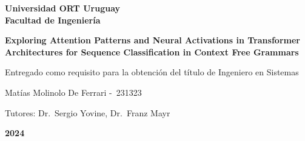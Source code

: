 \begin{center}

\textbf{\fontsize{14pt}{21pt}\selectfont Universidad ORT Uruguay\\Facultad de Ingeniería}

\bigskip\bigskip\bigskip\bigskip


\fontsize{24.88pt}{30pt}\selectfont 
\textbf{Exploring Attention Patterns and Neural Activations in Transformer Architectures for Sequence Classification in Context Free Grammars}


\bigskip\bigskip\bigskip\bigskip


\fontsize{14pt}{21pt}\selectfont Entregado como requisito para la obtención del título de Ingeniero en Sistemas


\bigskip
\bigskip
\bigskip\bigskip\bigskip


\fontsize{14pt}{21pt}\selectfont Matías Molinolo De Ferrari -\ 231323


\bigskip
\bigskip
\bigskip
\bigskip
\fontsize{14pt}{21pt}\selectfont Tutores: Dr.\ Sergio Yovine, Dr.\ Franz Mayr


\bigskip\bigskip\bigskip\bigskip


\fontsize{20.74pt}{21pt}\selectfont \textbf{2024}


\end{center}
\vspace*{\fill}
